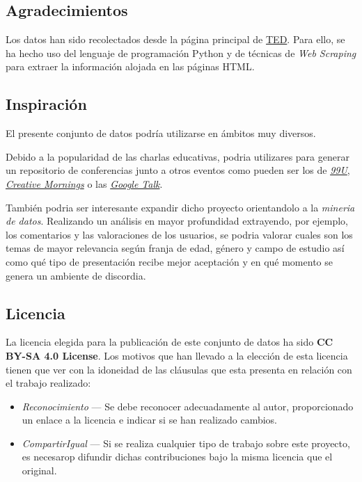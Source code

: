 \documentclass[
]{article}
\begin{document}
\hypertarget{agradecimientos}{%
\subsection{Agradecimientos}\label{agradecimientos}}

Los datos han sido recolectados desde la página principal de
\href{https://www.ted.com/talks}{TED}. Para ello, se ha hecho uso del
lenguaje de programación Python y de técnicas de \emph{Web Scraping}
para extraer la información alojada en las páginas HTML.

\hypertarget{inspiraciuxf3n}{%
\subsection{Inspiración}\label{inspiraciuxf3n}}

El presente conjunto de datos podría utilizarse en ámbitos muy diversos.

Debido a la popularidad de las charlas educativas, podria utilizares
para generar un repositorio de conferencias junto a otros eventos como
pueden ser los de \href{https://99u.adobe.com/}{\emph{99U}},
\href{https://creativemornings.com/}{\emph{Creative Mornings}} o las
\href{https://talksat.withgoogle.com/}{\emph{Google Talk}}.

También podria ser interesante expandir dicho proyecto orientandolo a la
\emph{mineria de datos}. Realizando un análisis en mayor profundidad
extrayendo, por ejemplo, los comentarios y las valoraciones de los
usuarios, se podria valorar cuales son los temas de mayor relevancia
según franja de edad, género y campo de estudio así como qué tipo de
presentación recibe mejor aceptación y en qué momento se genera un
ambiente de discordia.

\hypertarget{licencia}{%
\subsection{Licencia}\label{licencia}}

La licencia elegida para la publicación de este conjunto de datos ha
sido \textbf{CC BY-SA 4.0 License}. Los motivos que han llevado a la
elección de esta licencia tienen que ver con la idoneidad de las
cláusulas que esta presenta en relación con el trabajo realizado:

\begin{itemize}
\item
  \emph{Reconocimiento} --- Se debe reconocer adecuadamente al autor,
  proporcionado un enlace a la licencia e indicar si se han realizado
  cambios.
\item
  \emph{CompartirIgual} --- Si se realiza cualquier tipo de trabajo
  sobre este proyecto, es necesarop difundir dichas contribuciones bajo
  la misma licencia que el original.
\end{itemize}
\end{document}

